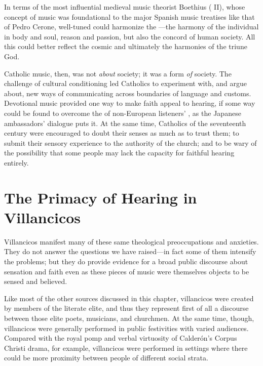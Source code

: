 In terms of the most influential medieval music theorist Boethius ( II), whose concept of music was foundational to the major Spanish music treatises like that of Pedro Cerone, well-tuned  could harmonize the ---the harmony of the individual in body and soul, reason and passion, but also the concord of human society.%
    \Autocites
    [II: 187--189]{Boethius:Musica}
    [203--208]{Cerone:Melopeo}
    [22--31]{Baker:Harmony}
All this could better reflect the cosmic  and ultimately the harmonies of the triune God.

Catholic music, then, was not \emph{about} society; it was a form \emph{of} society.
The challenge of cultural conditioning led Catholics to experiment with, and argue about, new ways of communicating across boundaries of language and customs.
Devotional music provided one way to make faith appeal to hearing, if some way could be found to overcome the  of non-European listeners' , as the Japanese ambassadors' dialogue puts it.
At the same time, Catholics of the seventeenth century were encouraged to doubt their senses as much as to trust them; to submit their sensory experience to the authority of the church; and to be wary of the possibility that some people may lack the capacity for faithful hearing entirely.

\section{The Primacy of Hearing in Villancicos}

Villancicos manifest many of these same theological preoccupations and anxieties.
They do not answer the questions we have raised---in fact some of them intensify the problems; but they do provide evidence for a broad public discourse about sensation and faith even as these pieces of music were themselves objects to be sensed and believed.

Like most of the other sources discussed in this chapter, villancicos were created by members of the literate elite, and thus they represent first of all a discourse between those elite poets, musicians, and churchmen.
At the same time, though, villancicos were generally performed in public festivities with varied audiences.
Compared with the royal pomp and verbal virtuosity of Calderón's Corpus Christi drama, for example, villancicos were performed in settings where there could be more proximity between people of different social strata.

